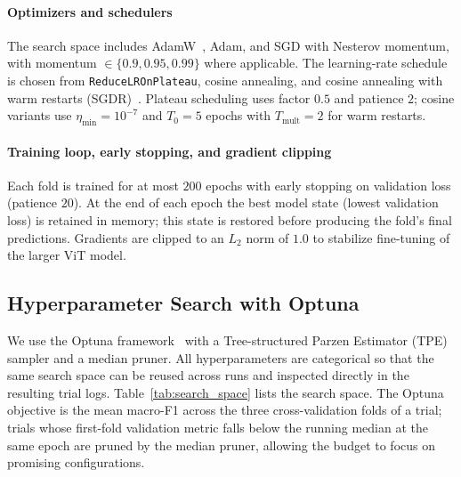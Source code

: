 \documentclass[conference]{IEEEtran}
\begin{document}
\paragraph{Optimizers and schedulers}
The search space includes AdamW~\cite{loshchilov2019adamw}, Adam, and SGD with Nesterov momentum, with momentum $\in \{0.9, 0.95, 0.99\}$ where applicable. The learning-rate schedule is chosen from \texttt{ReduceLROnPlateau}, cosine annealing, and cosine annealing with warm restarts (SGDR)~\cite{loshchilov2017sgdr}. Plateau scheduling uses factor $0.5$ and patience $2$; cosine variants use $\eta_{\min}=10^{-7}$ and $T_0=5$ epochs with $T_{\text{mult}}=2$ for warm restarts.

\paragraph{Training loop, early stopping, and gradient clipping}
Each fold is trained for at most $200$ epochs with early stopping on validation loss (patience $20$). At the end of each epoch the best model state (lowest validation loss) is retained in memory; this state is restored before producing the fold's final predictions. Gradients are clipped to an $L_2$ norm of $1.0$ to stabilize fine-tuning of the larger ViT model.

\subsection{Hyperparameter Search with Optuna}
\label{ssec:optuna}

We use the Optuna framework~\cite{akiba2019optuna} with a Tree-structured Parzen Estimator (TPE) sampler and a median pruner. All hyperparameters are categorical so that the same search space can be reused across runs and inspected directly in the resulting trial logs. Table~\ref{tab:search_space} lists the search space. The Optuna objective is the mean macro-F1 across the three cross-validation folds of a trial; trials whose first-fold validation metric falls below the running median at the same epoch are pruned by the median pruner, allowing the budget to focus on promising configurations.
\end{document}
